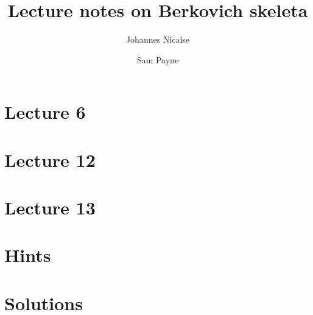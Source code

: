 \documentclass[10pt,a4paper,twoside]{article}
\title{Lecture notes on Berkovich skeleta}
\author{Johannes Nicaise \and Sam Payne}
\numberwithin{equation}{section}
\begin{document}
\maketitle

\tableofcontents







\section{Lecture 6}





\section{Lecture 12}
\section{Lecture 13}




\cleartoevenpage
\section{Hints}


\cleartoevenpage
\section{Solutions}

\end{document}
